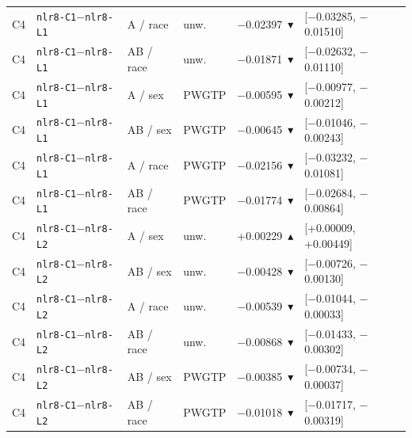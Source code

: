 \begin{tabular}{@{}llllrl@{}}
C4 & \texttt{nlr8-C1}$-$\texttt{nlr8-L1} & A / race & unw. & $-$0.02397~$\blacktriangledown$ & [$-$0.03285, $-$0.01510] \\
C4 & \texttt{nlr8-C1}$-$\texttt{nlr8-L1} & AB / race & unw. & $-$0.01871~$\blacktriangledown$ & [$-$0.02632, $-$0.01110] \\
C4 & \texttt{nlr8-C1}$-$\texttt{nlr8-L1} & A / sex & PWGTP & $-$0.00595~$\blacktriangledown$ & [$-$0.00977, $-$0.00212] \\
C4 & \texttt{nlr8-C1}$-$\texttt{nlr8-L1} & AB / sex & PWGTP & $-$0.00645~$\blacktriangledown$ & [$-$0.01046, $-$0.00243] \\
C4 & \texttt{nlr8-C1}$-$\texttt{nlr8-L1} & A / race & PWGTP & $-$0.02156~$\blacktriangledown$ & [$-$0.03232, $-$0.01081] \\
C4 & \texttt{nlr8-C1}$-$\texttt{nlr8-L1} & AB / race & PWGTP & $-$0.01774~$\blacktriangledown$ & [$-$0.02684, $-$0.00864] \\
C4 & \texttt{nlr8-C1}$-$\texttt{nlr8-L2} & A / sex & unw. & +0.00229~$\blacktriangle$ & [+0.00009, +0.00449] \\
C4 & \texttt{nlr8-C1}$-$\texttt{nlr8-L2} & AB / sex & unw. & $-$0.00428~$\blacktriangledown$ & [$-$0.00726, $-$0.00130] \\
C4 & \texttt{nlr8-C1}$-$\texttt{nlr8-L2} & A / race & unw. & $-$0.00539~$\blacktriangledown$ & [$-$0.01044, $-$0.00033] \\
C4 & \texttt{nlr8-C1}$-$\texttt{nlr8-L2} & AB / race & unw. & $-$0.00868~$\blacktriangledown$ & [$-$0.01433, $-$0.00302] \\
C4 & \texttt{nlr8-C1}$-$\texttt{nlr8-L2} & AB / sex & PWGTP & $-$0.00385~$\blacktriangledown$ & [$-$0.00734, $-$0.00037] \\
C4 & \texttt{nlr8-C1}$-$\texttt{nlr8-L2} & AB / race & PWGTP & $-$0.01018~$\blacktriangledown$ & [$-$0.01717, $-$0.00319] \\
\bottomrule
\end{tabular}
